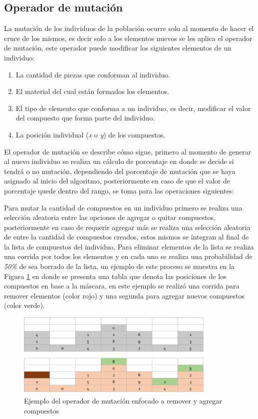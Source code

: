 \subsection{Operador de mutación}
\label{subsection:mutation_operator}

La mutación de los individuos de la población ocurre solo al momento de hacer el
cruce de los mismos, es decir solo a los elementos nuevos se les aplica el
operador de mutación, este operador puede modificar los siguientes elementos de
un individuo:

\begin{enumerate}
  \item La cantidad de piezas que conforman al individuo.
  \item El material del cual están formados los elementos.
  \item El tipo de elemento que conforma a un individuo, es decir, modificar el
  valor del compuesto que forma parte del individuo.
  \item La posición individual (\textit{x} o \textit{y}) de los compuestos.
\end{enumerate}

El operador de mutación se describe cómo sigue,
primero al momento de generar al nuevo individuo se realiza un cálculo de
porcentaje en donde se decide si tendrá o no mutación, dependiendo del porcentaje
de mutación que se haya asignado al inicio del algoritmo, posteriormente en caso
de que el valor de porcentaje quede dentro del rango, se toma para las
operaciones siguientes:

Para mutar la cantidad de compuestos en un individuo primero se realiza una
selección aleatoria entre las opciones de agregar o quitar compuestos,
posteriormente en caso de requerir agregar más se realiza una selección
aleatoria de entre la cantidad de compuestos creados, estos mismos se integran
al final de la lista de compuestos del individuo. Para eliminar elementos de la
lista se realiza una corrida por todos los elementos y en cada uno se realiza
una probabilidad de \textit{50\%} de sea borrado de la lista, un ejemplo de este
proceso se muestra en la Figura \ref{figure:mutate_add_remove} en donde se
presenta una tabla que denota las posiciones de los compuestos en base a la
máscara, en este ejemplo se realizó una corrida para remover elementos (color
rojo) y una segunda para agregar nuevos compuestos (color verde).

\begin{figure}
  \centering
  \includegraphics[width=0.85\textwidth]{img/mutation_add_remove.png}
  \caption{Ejemplo del operador de mutación enfocado a remover y agregar compuestos}
  \label{figure:mutate_add_remove}
\end{figure}

